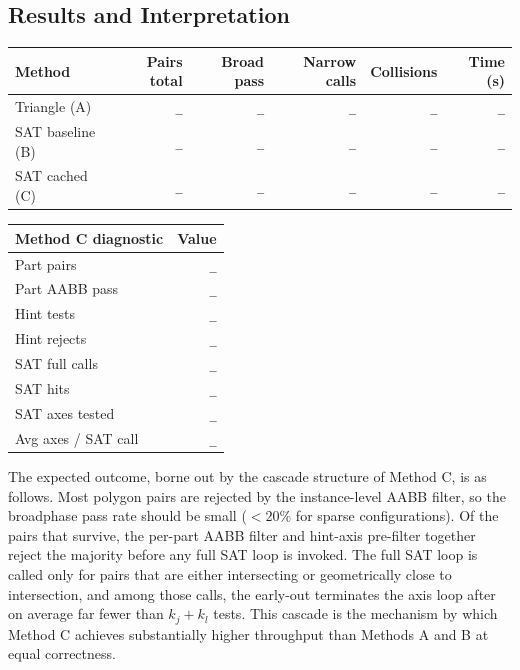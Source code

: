 \subsection{Results and Interpretation}
\label{sec:bench-results}

\begin{center}
\begin{tabular}{lrrrrr}
\toprule
Method & Pairs total & Broad pass & Narrow calls & Collisions & Time (s) \\
\midrule
Triangle (A) & \texttt{\_} & \texttt{\_} & \texttt{\_} & \texttt{\_} & \texttt{\_} \\
SAT baseline (B) & \texttt{\_} & \texttt{\_} & \texttt{\_} & \texttt{\_} & \texttt{\_} \\
SAT cached (C) & \texttt{\_} & \texttt{\_} & \texttt{\_} & \texttt{\_} & \texttt{\_} \\
\bottomrule
\end{tabular}
\end{center}

\begin{center}
\begin{tabular}{lr}
\toprule
Method C diagnostic & Value \\
\midrule
Part pairs & \texttt{\_} \\
Part AABB pass & \texttt{\_} \\
Hint tests & \texttt{\_} \\
Hint rejects & \texttt{\_} \\
SAT full calls & \texttt{\_} \\
SAT hits & \texttt{\_} \\
SAT axes tested & \texttt{\_} \\
Avg axes / SAT call & \texttt{\_} \\
\bottomrule
\end{tabular}
\end{center}

The expected outcome, borne out by the cascade structure of Method C,
is as follows. Most polygon pairs are rejected by the instance-level
AABB filter, so the broadphase pass rate should be small ($< 20\%$
for sparse configurations). Of the pairs that survive, the per-part
AABB filter and hint-axis pre-filter together reject the majority before
any full SAT loop is invoked. The full SAT loop is called only for pairs
that are either intersecting or geometrically close to intersection,
and among those calls, the early-out terminates the axis loop after
on average far fewer than $k_j + k_l$ tests. This cascade is the
mechanism by which Method C achieves substantially higher throughput
than Methods A and B at equal correctness.

